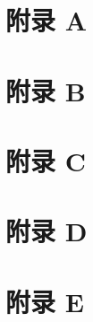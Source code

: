 \documentclass[12pt, a4paper, oneside]{ctexbook}
\begin{document}
	\chapter*{附录 A} \label{appendix_a}
	
	
	\chapter*{附录 B} \label{appendix_b}
	
	
	\chapter*{附录 C} \label{appendix_c}
	
	
	\chapter*{附录 D} \label{appendix_d}
	
	
	\chapter*{附录 E} \label{appendix_e}
	
	
	
\end{document}
